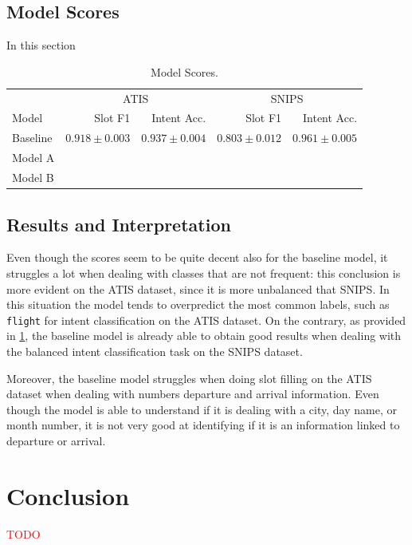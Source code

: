 \documentclass[a4paper]{article}
\begin{document}
\subsection{Model Scores}
In this section

\begin{table}[hbtp]
    \centering
    \begin{tabular}{lrrrr}
        \toprule
            & \multicolumn{2}{c}{ATIS} & \multicolumn{2}{c}{SNIPS} \\
            Model & Slot F1  & Intent Acc. & Slot F1 & Intent Acc.\\
        \midrule
            Baseline & $0.918 \pm 0.003$ & $0.937 \pm 0.004$ & $0.803 \pm 0.012$ & $0.961 \pm 0.005$ \vspace{0.2cm}\\
            Model A & & & & \vspace{0.2cm}\\
            Model B & & & & \\
        \bottomrule
    \end{tabular}
    \caption{Model Scores.}
    \label{tab:model-score}
\end{table}

\subsection{Results and Interpretation}
Even though the scores seem to be quite decent also for the baseline model, it struggles a lot when dealing with classes that are not frequent: this conclusion is more evident on the ATIS dataset, since it is more unbalanced that SNIPS. In this situation the model tends to overpredict the most common labels, such as \texttt{flight} for intent classification on the ATIS dataset. On the contrary, as provided in \cref{tab:model-score}, the baseline model is already able to obtain good results when dealing with the balanced intent classification task on the SNIPS dataset. 

Moreover, the baseline model struggles when doing slot filling on the ATIS dataset when dealing with numbers departure and arrival information. Even though the model is able to understand if it is dealing with a city, day name, or month number, it is not very good at identifying if it is an information linked to departure or arrival.

\section{Conclusion}
\textcolor{red}{TODO}




\end{document}
